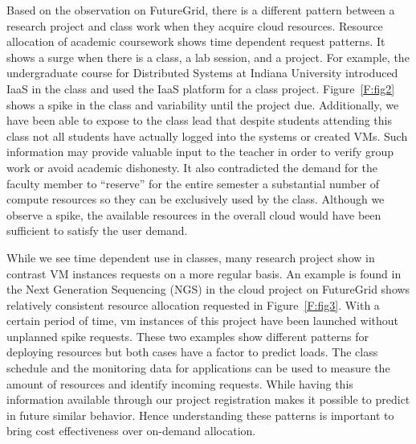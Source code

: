 \documentclass{sig-alternate-05-2015}
\begin{document}
Based on the observation on FutureGrid, there is a different pattern
between a research project and class work when they acquire cloud
resources. Resource allocation of academic coursework shows time
dependent request patterns. It shows a surge when there is a class, a
lab session, and a project. For example, the undergraduate course for
Distributed Systems at Indiana University introduced IaaS in the class
and used the IaaS platform for a class project. Figure~\ref{F:fig2}
shows a spike in the class and variability until the project due. 
Additionally, we have been able to expose to the class lead that
despite students attending this class not all students have actually
logged into the systems or created VMs. Such information may provide
valuable input to the teacher in order to verify group work or avoid
academic dishonesty. It also contradicted the demand for the faculty
member to ``reserve'' for the entire semester a substantial number of
compute resources so they can be exclusively used by the
class. Although we observe a spike, the available resources in the
overall cloud would have been sufficient to satisfy the user demand.

While we see time dependent use in classes, many research project show
in contrast VM instances requests on a more regular basis. An example
is found in the Next Generation Sequencing (NGS) in the cloud project
on FutureGrid shows relatively consistent resource allocation
requested in Figure~\ref{F:fig3}. With a certain period of time, vm
instances of this project have been launched without unplanned spike
requests. These two examples show different patterns for deploying
resources but both cases have a factor to predict loads. The class
schedule and the monitoring data for applications can be used to
measure the amount of resources and identify incoming requests.  While
having this information available through our project registration
makes it possible to predict in future similar behavior.  Hence
understanding these patterns is important to bring cost effectiveness
over on-demand allocation.
\end{document}

